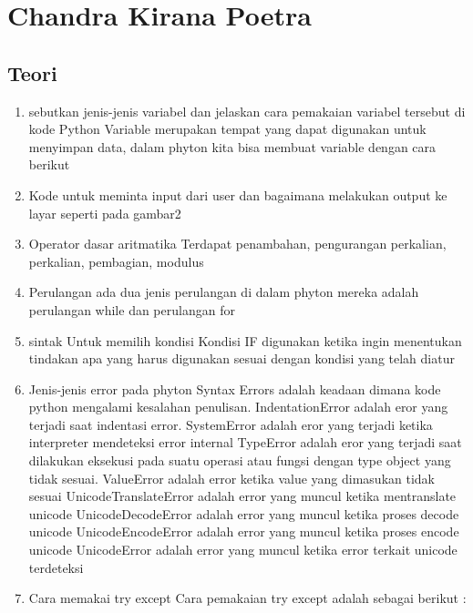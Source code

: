 \section{Chandra Kirana Poetra}
\subsection{Teori}
\begin{enumerate}

\item sebutkan jenis-jenis variabel dan jelaskan cara pemakaian variabel tersebut di kode Python
Variable merupakan tempat yang dapat digunakan untuk menyimpan data, dalam phyton kita bisa membuat variable dengan cara berikut


\item Kode untuk meminta input dari user dan bagaimana melakukan output ke layar seperti pada gambar2


\item Operator dasar aritmatika
Terdapat penambahan, pengurangan perkalian, perkalian, pembagian, modulus



\item Perulangan
ada dua jenis perulangan di dalam phyton mereka adalah perulangan while dan perulangan for


\item sintak Untuk memilih kondisi
Kondisi IF digunakan ketika ingin menentukan tindakan apa yang harus digunakan sesuai dengan kondisi yang telah diatur



\item Jenis-jenis error pada phyton
Syntax Errors adalah keadaan dimana kode python mengalami kesalahan penulisan. 
IndentationError adalah eror yang terjadi saat indentasi error.
SystemError adalah eror yang terjadi ketika interpreter mendeteksi error internal
TypeError adalah eror yang terjadi saat dilakukan eksekusi pada suatu operasi atau fungsi dengan type object yang tidak sesuai.
ValueError adalah error ketika value yang dimasukan tidak sesuai
UnicodeTranslateError adalah error yang muncul ketika mentranslate unicode
UnicodeDecodeError adalah error yang muncul ketika  proses decode unicode
UnicodeEncodeError adalah error yang muncul ketika  proses encode unicode
UnicodeError adalah error yang muncul ketika error terkait unicode terdeteksi

\item Cara memakai try except
Cara pemakaian try except adalah sebagai berikut :
    


\end{enumerate}

